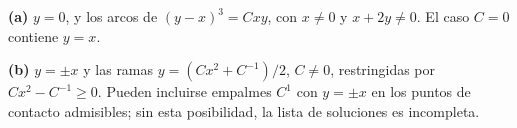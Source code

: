 \noindent\textbf{(a)} $y=0$, y los arcos de $(y-x)^3=Cxy$, con $x\ne0$ y $x+2y\ne0$. El caso $C=0$ contiene $y=x$.

\noindent\textbf{(b)} $y=\pm x$ y las ramas $y=(Cx^2+C^{-1})/2$, $C\ne0$, restringidas por $Cx^2-C^{-1}\ge0$. Pueden incluirse empalmes $C^1$ con $y=\pm x$ en los puntos de contacto admisibles; sin esta posibilidad, la lista de soluciones es incompleta.
